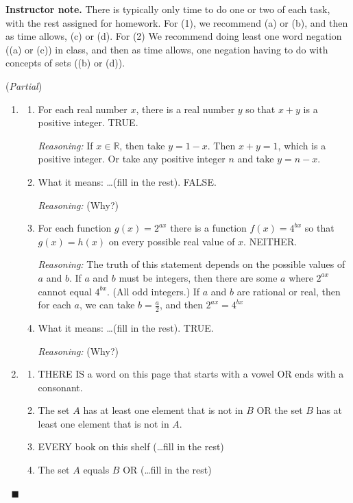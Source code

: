 \documentclass[11pt]{article}
\newcommand\smallnote[1]
	{\begin{mdframed}\raggedright  {\bf Instructor note.} {#1} \end{mdframed}}
\newcommand{\R}{\mathbb{R}}
\theoremstyle{definition}
\newenvironment{solution}{{\it Solution.} }{\hfill {\color{lightgray}$\blacksquare$}}
\begin{document}
\smallnote{There is typically only time to do one or two of each task, with the rest assigned for homework.  For (1), we recommend (a) or (b), and then as time allows, (c) or (d). For (2) We recommend doing least one word negation ((a) or (c)) in class, and then as time allows, one negation having to do with concepts of sets ((b) or (d)).}

\begin{solution}({\it Partial})
\begin{enumerate}
\item  \begin{enumerate}
	\item For each real number $x$, there is a real number $y$ so that $x+y$ is a positive integer.  TRUE.  
	
{\it Reasoning:} If $x\in \R$, then take $y=1-x$. Then $x+y=1$, which is a positive integer. Or take any positive integer $n$ and take $y=n-x$.

	\item  What it means: \dots (fill in the rest). FALSE.
	
	{\it Reasoning:}  (Why?)
	\item For each function $g(x)=2^{ax}$ there is a function $f(x)=4^{bx}$ so that $g(x)=h(x)$ on every possible real value of $x$. NEITHER. 
	
	{\it Reasoning:} The truth of this statement depends on the possible values of $a$ and $b$. If $a$ and $b$ must be integers, then there are some $a$ where $2^{ax}$ cannot equal $4^{bx}$. (All odd integers.) If $a$ and $b$ are rational or real, then for each $a$, we can take $b=\frac{a}{2}$, and then $2^{ax}=4^{bx}$
	\item What it means: \dots (fill in the rest). TRUE. 
	
	{\it Reasoning:}  (Why?)
	\end{enumerate}
\item 
	\begin{enumerate}
	\item THERE IS a word on this page that starts with a vowel OR ends with a consonant.
	\item The set $A$ has at least one element that is not in $B$ OR the set $B$ has at least one element that is not in $A$.
	\item EVERY book on this shelf (\dots fill in the rest)
	\item The set $A$ equals $B$ OR (\dots fill in the rest)
	\end{enumerate}
\end{enumerate}
\vspace*{-18pt}$\;$
\end{solution}
\end{document}
